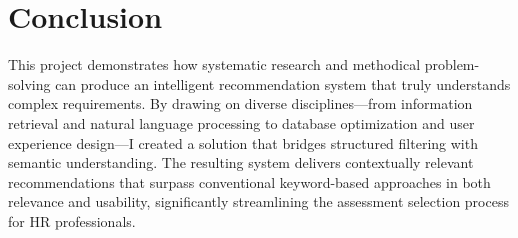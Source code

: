 \documentclass[10pt,a4paper,twocolumn]{article}
\begin{document}
\section*{Conclusion}
\small
This project demonstrates how systematic research and methodical problem-solving can produce an intelligent recommendation system that truly understands complex requirements. By drawing on diverse disciplines—from information retrieval and natural language processing to database optimization and user experience design—I created a solution that bridges structured filtering with semantic understanding. The resulting system delivers contextually relevant recommendations that surpass conventional keyword-based approaches in both relevance and usability, significantly streamlining the assessment selection process for HR professionals.
\end{document}

